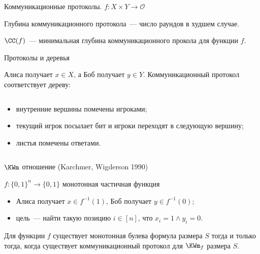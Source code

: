 \begin{frame}{Коммуникационные протоколы. $f: X \times Y \to \mathcal{O}$}
    \begin{center}
    	    
    \end{center}

    \pause
    \pause
    \pause
	\pause
    
    Глубина коммуникационного протокола~--- число раундов в худшем случае.
    
    $\CC(f)$~--- минимальная глубина коммуникационного прокола для функции $f$.
\end{frame}

\begin{frame}{Протоколы и деревья}

    Алиса получает $x \in X$, а Боб получает $y \in Y$. Коммуникационный протокол соответствует дереву:
    \begin{columns}[t]
		\begin{column}{0.7\textwidth}
            \begin{itemize}
                \item<2-> внутренние вершины помечены игроками;
	            \item<3-> текущий игрок посылает бит и игроки переходят в следующую вершину;
    		    \item<8-> листья помечены ответами.
	        \end{itemize}

        \end{column}
        
		\begin{column}{0.25\textwidth}
            
		\end{column}
	\end{columns}

\end{frame}

\begin{frame}{$\KWm$ отношение (Karchmer, Wigderson 1990)}

    $f:\{0, 1\}^n \to \{0, 1\}$ монотонная частичная функция
    
    \begin{itemize}
        \item Алиса получает $x \in f^{-1}(1)$, Боб получает $y \in f^{-1}(0)$;
        \item цель~--- найти такую позицию $i \in [n]$, что $x_i = 1 \land y_i = 0$.
    \end{itemize}

    \pause
    \begin{theorem}
        Для функции $f$ существует монотонная булева формула размера $S$ тогда и только тогда, когда
        существует коммуникационный протокол для $\KWm_f$ размера $S$.
    \end{theorem}

\end{frame}


